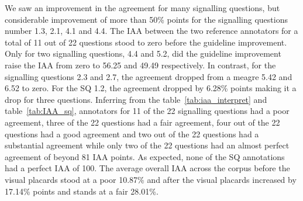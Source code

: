 \documentclass[sn-mathphys,Numbered]{sn-jnl}%
\theoremstyle{thmstyleone}%
\theoremstyle{thmstyletwo}%
\theoremstyle{thmstylethree}%
\begin{document}
We saw an improvement in the agreement for many signalling questions, but considerable improvement of more than 50\% points for the signalling questions number 1.3, 2.1, 4.1 and 4.4.
The IAA between the two reference annotators for a total of 11 out of 22 questions stood to zero before the guideline improvement.
Only for two signalling questions, 4.4 and 5.2, did the guideline improvement raise the IAA from zero to 56.25 and 49.49 respectively.
In contrast, for the signalling questions 2.3 and 2.7, the agreement dropped from a meagre 5.42 and 6.52 to zero.
For the SQ 1.2, the agreement dropped by 6.28\% points making it a drop for three questions.
Inferring from the table~\ref{tab:iaa_interpret} and table~\ref{tab:IAA_sq}, annotators for 11 of the 22 signalling questions had a poor agreement, three of the 22 questions had a fair agreement, four out of the 22 questions had a good agreement and two out of the 22 questions had a substantial agreement while only two of the 22 questions had an almost perfect agreement of beyond 81 IAA points.
As expected, none of the SQ annotations had a perfect IAA of 100.
The average overall IAA across the corpus before the visual placards stood at a poor 10.87\% and after the visual placards increased by 17.14\% points and stands at a fair 28.01\%.
%
%
%
\end{document}
